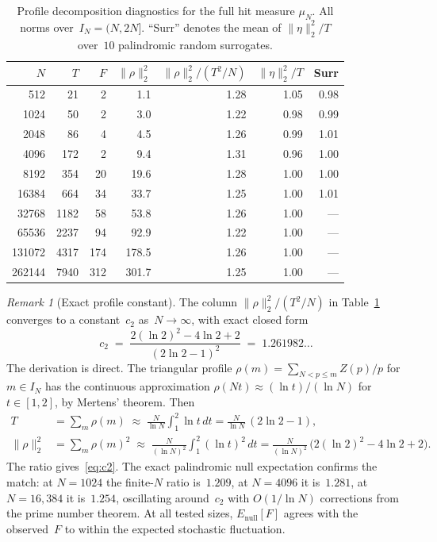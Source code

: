 \documentclass[11pt]{article}
\theoremstyle{definition}
\theoremstyle{remark}
\newtheorem{remark}[theorem]{Remark}
\begin{document}
\begin{table}[ht]
\centering
\caption{Profile decomposition diagnostics
for the full hit measure $\mu_N$.
All norms over~$I_N = (N, 2N]$.
``Surr'' denotes the mean of
$\|\eta\|_2^2/T$ over~$10$
palindromic random surrogates.}
\label{tab:residual}
\smallskip
\begin{tabular}{rrrrrrr}
\toprule
$N$ & $T$ & $F$ &
$\|\rho\|_2^2$ &
$\|\rho\|_2^2/(T^2/N)$ &
$\|\eta\|_2^2/T$ &
Surr \\
\midrule
512 & 21 & 2 & 1.1 & 1.28 & 1.05 & 0.98 \\
1024 & 50 & 2 & 3.0 & 1.22 & 0.98 & 0.99 \\
2048 & 86 & 4 & 4.5 & 1.26 & 0.99 & 1.01 \\
4096 & 172 & 2 & 9.4 & 1.31 & 0.96 & 1.00 \\
8192 & 354 & 20 & 19.6 & 1.28 & 1.00 & 1.00 \\
16384 & 664 & 34 & 33.7 & 1.25 & 1.00 & 1.01 \\
32768 & 1182 & 58 & 53.8 & 1.26 & 1.00 & --- \\
65536 & 2237 & 94 & 92.9 & 1.22 & 1.00 & --- \\
131072 & 4317 & 174 & 178.5 & 1.26 & 1.00 & --- \\
262144 & 7940 & 312 & 301.7 & 1.25 & 1.00 & --- \\
\bottomrule
\end{tabular}
\end{table}

\begin{remark}[Exact profile constant]
\label{rem:profile-constant}
The column $\|\rho\|_2^2/(T^2/N)$ in
Table~\ref{tab:residual} converges
to a constant~$c_2$ as~$N \to \infty$,
with exact closed form
\begin{equation}\label{eq:c2}
  c_2
  \;=\;
  \frac{2(\ln 2)^2 - 4\ln 2 + 2}
       {(2\ln 2 - 1)^2}
  \;=\; 1.261982\ldots
\end{equation}
The derivation is direct.
The triangular profile
$\rho(m) = \sum_{N < p \le m} Z(p)/p$
for $m \in I_N$ has the continuous
approximation $\rho(Nt) \approx
(\ln t)/(\ln N)$ for $t \in [1,2]$,
by Mertens' theorem.
Then
\begin{align*}
  T &= \sum_m \rho(m)
  \;\approx\; \frac{N}{\ln N}
  \int_1^2 \ln t\,dt
  = \frac{N}{\ln N}\,(2\ln 2 - 1),\\
  \|\rho\|_2^2 &= \sum_m \rho(m)^2
  \;\approx\; \frac{N}{(\ln N)^2}
  \int_1^2 (\ln t)^2\,dt
  = \frac{N}{(\ln N)^2}\,
  \bigl(2(\ln 2)^2 - 4\ln 2 + 2\bigr).
\end{align*}
The ratio gives~\eqref{eq:c2}.
The exact palindromic null expectation
confirms the match:
at $N = 1024$ the finite-$N$ ratio
is~$1.209$,
at $N = 4096$ it is~$1.281$,
at $N = 16{,}384$ it is~$1.254$,
oscillating around~$c_2$ with
$O(1/\ln N)$ corrections from the
prime number theorem.
At all tested sizes,
$E_{\mathrm{null}}[F]$ agrees with
the observed~$F$ to within the
expected stochastic fluctuation.
\end{remark}
\end{document}
